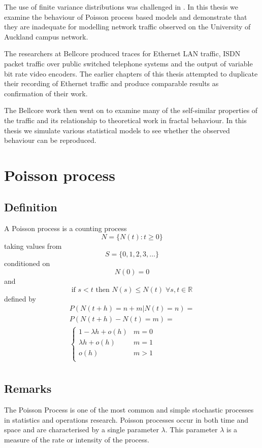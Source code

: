 The use of finite variance distributions was challenged in
\cite{Bell:1}.  In this thesis we examine the behaviour of Poisson
process based models and demonstrate that they are inadequate for
modelling network traffic observed on the University of Auckland
campus network.

The researchers at Bellcore produced traces for Ethernet LAN traffic,
ISDN packet traffic over public switched telephone systems and the
output of variable bit rate video encoders.  The earlier chapters of
this thesis attempted to duplicate their recording of Ethernet traffic
and produce comparable results as confirmation of their work.

The Bellcore work then went on to examine many of the self-similar
properties of the traffic and its relationship to theoretical work in
fractal behaviour.  In this thesis we simulate various statistical
models to see whether the observed behaviour can be reproduced.

\section{Poisson process}

\subsection{Definition}

A Poisson process is a counting process
\[ N = \{ N(t) : t \geq 0 \} \]
taking values from
\[ S = \{ 0,1,2,3, \ldots \} \]
conditioned on
\[N(0) = 0\]
and
\[ \mbox{if } s < t \mbox{ then } N(s) \leq N(t) \; \forall s,t \in {\mathbb R} \]
defined by
\[
\begin{array}{c}
P(N(t+h) = n + m | N(t) = n) = \\
P(N(t+h) - N(t) = m) = \\
\left\{
\begin{array}{rl}
1 - \lambda h + o(h) & m = 0 \\
\lambda h + o(h) & m = 1 \\
o(h) & m > 1 \\
\end{array}
\right. \\
\end{array}
\]

\subsection{Remarks}

The Poisson Process is one of the most common and simple stochastic
processes in statistics and operations research.  Poisson processes
occur in both time and space and are characterised by a single
parameter $\lambda$.  This parameter $\lambda$ is a measure of the
rate or intensity of the process.

